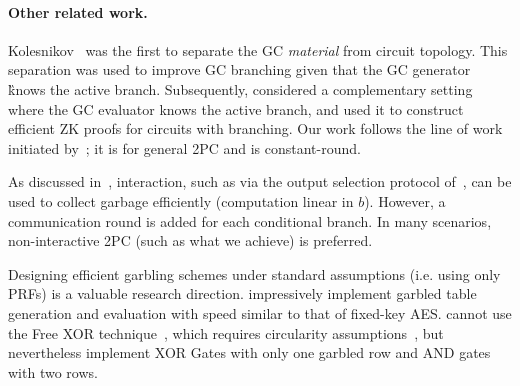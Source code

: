 \paragraph{Other related work.}


Kolesnikov~\cite{AC:Kolesnikov18} was the first to separate the GC
{\em material} from circuit topology.
This separation was used to improve GC branching
given that the GC generator \G knows the active branch.
Subsequently, \cite{EC:HeaKol20} considered a complementary setting
where the GC evaluator \E knows the active branch, and used it to
construct efficient ZK proofs for circuits with branching.  Our work
follows the line of work initiated
by~\cite{AC:Kolesnikov18,EC:HeaKol20}; it is for general 2PC and is
constant-round.

As discussed in~\HK, interaction, such as via the output
selection protocol of~\cite{AC:Kolesnikov18}, can be used to collect
garbage efficiently (computation linear in $b$).
However, a communication round is added for each conditional branch.
In many scenarios, non-interactive 2PC (such as what we achieve) is preferred.

Designing efficient garbling schemes under standard assumptions (i.e.
using only PRFs) is a valuable research direction.
\cite{CCS:GLNP15} impressively implement garbled table
generation and evaluation with speed similar to that of
fixed-key AES.
\cite{CCS:GLNP15} cannot use the Free XOR technique~\cite{ICALP:KolSch08}, which requires circularity
assumptions~\cite{TCC:CKKZ12}, but nevertheless implement XOR Gates
with only one garbled row and AND gates with two rows.
